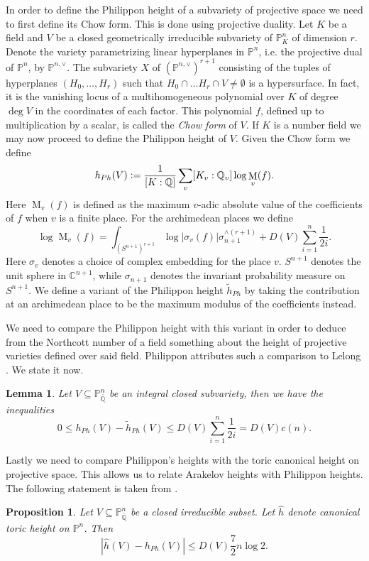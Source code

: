 \documentclass[11pt, a4paper, UKenglish]{amsart}
\newcommand{\Q}{\mathbb{Q}}
\newcommand{\Qbar}{\bar{\mathbb{Q}}}
\newcommand{\bbC}{\mathbb{C}}
\newcommand{\bbP}{\mathbb{P}}
\DeclareMathOperator{\M}{M}
\newcommand{\defeq}{\vcentcolon=}
\newcommand{\eqn}[1]{\begin{equation*}#1\end{equation*}}
\newtheorem{lemma_}[thm_]{Lemma}
\newtheorem{prop_}[thm_]{Proposition}
\theoremstyle{definition}
\newcommand{\lemm}[1]{\begin{lemma_}#1\end{lemma_}}
\newcommand{\prop}[1]{\begin{prop_}#1\end{prop_}}
\begin{document}
In order to define the Philippon height of a subvariety of projective space we need to first define its Chow form. This is done using projective duality. Let $K$ be a field and $V$ be a closed geometrically irreducible subvariety of $\bbP_K^n$ of dimension $r$. Denote the variety parametrizing linear hyperplanes in $\bbP^n$, i.e. the projective dual of $\bbP^n$, by $\bbP^{n,\vee}$. The subvariety $X$ of $(\bbP^{n,\vee})^{r+1}$ consisting of the tuples of hyperplanes $(H_0, \dots, H_r)$ such that $H_0 \cap \dots H_r \cap V \neq \emptyset$ is a hypersurface. In fact, it is the vanishing locus of a multihomogeneous polynomial over $K$ of degree $\deg V$ in the coordinates of each factor. This polynomial $f$, defined up to multiplication by a scalar, is called the \emph{Chow form} of $V$. If $K$ is a number field we may now proceed to define the Philippon height of $V$. Given the Chow form we define
\eqn{h_{Ph}(V) \defeq \frac{1}{[K:\Q]} \sum_v [K_v:\Q_v] \log{\M_v(f)}.}
Here $\M_v(f)$ is defined as the maximum $v$-adic absolute value of the coefficients of $f$ when $v$ is a finite place. For the archimedean places we define
\eqn{\log\M_v(f) = \int_{(S^{n+1})^{r+1}} \log|\sigma_v(f)| \sigma^{\wedge (r+1)}_{n+1} + D(V)\sum^{n}_{i=1} \frac{1}{2i}.}
Here $\sigma_v$ denotes a choice of complex embedding for the place $v$. $S^{n+1}$ denotes the unit sphere in $\bbC^{n+1}$, while $\sigma_{n+1}$ denotes the invariant probability measure on $S^{n+1}$. We define a variant of the Philippon height $\tilde{h}_{Ph}$ by taking the contribution at an archimedean place to be the maximum modulus of the coefficients instead.

We need to compare the Philippon height with this variant in order to deduce from the Northcott number of a field something about the height of projective varieties defined over said field. Philippon attributes such a comparison to Lelong \cite[Th\'eor\`eme 4]{lelong}. We state it now.

\lemm{\label{comp2} Let $V \subseteq \bbP_{\Qbar}^n$ be an integral closed subvariety, then we have the inequalities
\eqn{0 \leq h_{Ph}(V)-\tilde{h}_{Ph}(V) \leq D(V)\sum_{i=1}^{n}\frac{1}{2i} = D(V)c(n).}
}

Lastly we need to compare Philippon's heights with the toric canonical height on projective space. This allows us to relate Arakelov heights with Philippon heights. The following statement is taken from \cite[Prop 2.1]{philtor}.

\prop{\label{torbound}Let $V \subseteq \bbP_{\Qbar}^n$ be a closed irreducible subset. Let $\hat{h}$ denote canonical toric height on $\bbP^n$. Then
\eqn{|\hat{h}(V)-h_{Ph}(V)| \leq D(V)\frac{7}{2}n \log 2 .}
}
\end{document}
